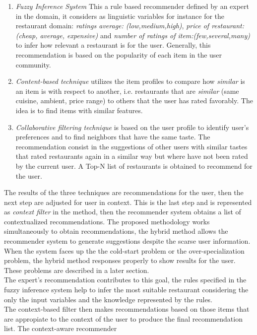\begin{enumerate}  
\item \textit{Fuzzy Inference System} This a rule based recommender 
defined by an expert in the domain, it considers as linguistic variables 
for instance for the restaurant domain: \textit{ratings average:
(low,medium,high)}, \textit{price of restaurant:(cheap, average, 
expensive)} and \textit{number of ratings of item:(few,several,many)} 
to infer how relevant a restaurant is for the user. Generally, 
this recommendation is based on the popularity of each item in the 
user community.
\item \textit{Content-based technique} utilizes the item profiles 
to compare how \textit{similar} is an item is with respect to 
another, i.e. restaurants that are \textit{similar} (same cuisine, 
ambient, price range)  to others that the user has rated favorably. 
The idea is to find items with similar features. 
\item \textit{Collaborative filtering technique} is based on the user
profile to identify user's preferences and to find neighbors that
have the same taste. The recommendation consist in the suggestions of
other users with similar tastes that rated restaurants again in a
similar way but where have not been rated by the current user. A Top-N
list of restaurants is obtained to recommend for the user.
\end{enumerate} 
The results of the three techniques are recommendations for the user,
then the next step are adjusted 
for user in context.
This is the last step and is represented as \textit{context filter} in
the method, then the recommender system obtains a list of
contextualized recommendations. The proposed methodology works
simultaneously to obtain recommendations, the hybrid method allows the
recommender system to generate suggestions despite the scarse
user information. When the system faces up the the cold-start
problem or the over-specialization problem, the hybrid method
responses properly to show results for the user. These problems  
are described in a later section. \\
The expert's recommendation contributes to this goal, the rules 
specified in the fuzzy inference system help to infer the most suitable 
restaurant considering the only the input variables and the knowledge 
represented by the rules.\\
The context-based filter then makes recommendations based on those
items that are appropiate to the context of the user to produce
the final recommendation list. The context-aware recommender
